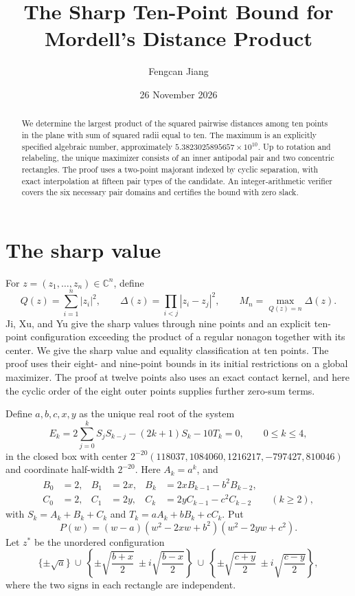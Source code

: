 \documentclass[11pt]{article}
\title{The Sharp Ten-Point Bound for Mordell's Distance Product}
\author{Fengcan Jiang}
\date{26 November 2026}
\begin{document}
\maketitle

\begin{abstract}
We determine the largest product of the squared pairwise distances among ten
points in the plane with sum of squared radii equal to ten. The maximum is
an explicitly specified algebraic number, approximately
\(5.3823025895657\times 10^{10}\). Up to rotation and relabeling, the unique
maximizer consists of an inner antipodal pair and two concentric rectangles.
The proof uses a two-point majorant indexed by cyclic separation, with
exact interpolation at fifteen pair types of the candidate. An
integer-arithmetic verifier covers the six necessary pair domains and
certifies the bound with zero slack.
\end{abstract}

\section{The sharp value}

For \(z=(z_1,\ldots,z_n)\in\mathbb C^n\), define
\[
 Q(z)=\sum_{i=1}^n |z_i|^2,\qquad
 \Delta(z)=\prod_{i<j}|z_i-z_j|^2,\qquad
 M_n=\max_{Q(z)=n}\Delta(z).
\]
Ji, Xu, and Yu \cite{jxy} give the sharp values through nine points and
an explicit ten-point configuration exceeding the product of a regular
nonagon together with its center. We give the sharp value and equality
classification at ten points. The proof uses their eight- and nine-point
bounds in its initial restrictions on a global maximizer. The proof at
twelve points \cite{n12} also uses an exact contact kernel, and here the
cyclic order of the eight outer points supplies further zero-sum terms.

Define \(a,b,c,x,y\) as the unique real root of the system
\begin{equation}
 E_k=2\sum_{j=0}^kS_j S_{k-j}-(2k+1)S_k-10T_k=0,
 \qquad 0\le k\le4,                                           \label{eq:root}
\end{equation}
in the closed box with center
\(2^{-20}(118037,1084060,1216217,-797427,810046)\) and coordinate
half-width \(2^{-20}\). Here \(A_k=a^k\), and
\[
\begin{aligned}
 B_0&=2, & B_1&=2x, &
 B_k&=2xB_{k-1}-b^2 B_{k-2},\\
 C_0&=2, & C_1&=2y, &
 C_k&=2yC_{k-1}-c^2 C_{k-2}\qquad (k\ge2),
\end{aligned}
\]
with \(S_k=A_k+B_k+C_k\) and \(T_k=aA_k+bB_k+cC_k\). Put
\[
 P(w)=(w-a)(w^2-2xw+b^2)(w^2-2yw+c^2).
\]
Let \(z^*\) be the unordered configuration
\begin{equation}
 \{\pm\sqrt a\}
 \ \cup\
 \left\{\pm\sqrt{\frac{b+x}{2}}\ \pm i\sqrt{\frac{b-x}{2}}\right\}
 \ \cup\
 \left\{\pm\sqrt{\frac{c+y}{2}}\ \pm i\sqrt{\frac{c-y}{2}}\right\},
                                                               \label{eq:config}
\end{equation}
where the two signs in each rectangle are independent.
\end{document}
